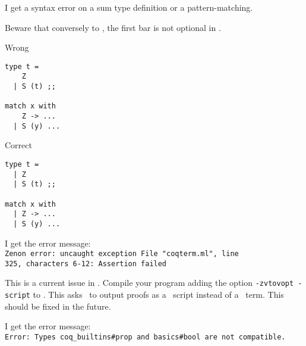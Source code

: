 \documentclass[10pt,a4paper]{article}
\begin{document}
\bigskip
{}
\begin{adjustwidth}{2em}{0em}
I get a syntax error on a sum type definition or a pattern-matching.
\end{adjustwidth}

\medskip
{}
\begin{adjustwidth}{2em}{0em}
Beware that conversely to \ocaml, the first bar is not optional in \focal.

\begin{minipage}{6.2cm}
Wrong
{\small
\begin{lstlisting}
type t =
    Z
  | S (t) ;;

match x with
    Z -> ...
  | S (y) ...
\end{lstlisting}}
\end{minipage}\hskip1cm
\begin{minipage}{6.2cm}
Correct
{\small
\begin{lstlisting}
type t =
  | Z
  | S (t) ;;

match x with
  | Z -> ...
  | S (y) ...
\end{lstlisting}}
\end{minipage}
\end{adjustwidth}



\bigskip
{}
\begin{adjustwidth}{2em}{0em}
I get the error message:\\
  \verb+Zenon error: uncaught exception File "coqterm.ml", line +\\
  \verb+325, characters 6-12: Assertion failed+
\end{adjustwidth}

\medskip
{}
\begin{adjustwidth}{2em}{0em}
This is a current issue in \zenon. Compile your program
adding the option \verb+-zvtovopt -script+ to \focalizec. This asks
\zenon\ to output proofs as a \coq\ script instead of a \coq\ term. This should
be fixed in the future.
\end{adjustwidth}



\bigskip
{}
\begin{adjustwidth}{2em}{0em}
I get the error message:\\
  \verb+Error: Types coq_builtins#prop and basics#bool are not compatible.+
\end{adjustwidth}
\end{document}
